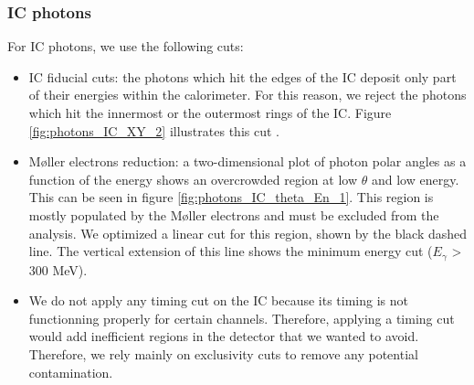 \subsubsection*{IC photons}
For IC photons, we use the following cuts:
\begin{itemize}
\item IC fiducial cuts: the photons which hit the edges of the IC deposit only part of their energies within the calorimeter. For this reason, we reject the photons which hit the innermost or the outermost rings of the IC. Figure \ref{fig:photons_IC_XY_2} illustrates this cut \cite{FX_thesis}.

\item M\o ller electrons reduction: a two-dimensional plot of photon polar angles as a function of the energy shows an overcrowded region at low $\theta$ and low energy. This can be seen in figure \ref{fig:photons_IC_theta_En_1}. This region is mostly populated by the M\o ller electrons and must be excluded from the analysis. We optimized a linear cut for this region, shown by the black dashed line. The vertical extension of this line shows the minimum energy cut ($E_{\gamma}$ > 300 MeV).
\item We do not apply any timing cut on the IC because its timing is not functionning properly for certain channels. Therefore, applying a timing cut would add inefficient regions in the detector that we wanted to avoid. Therefore, we rely mainly on exclusivity cuts to remove any potential contamination.

\end{itemize}
